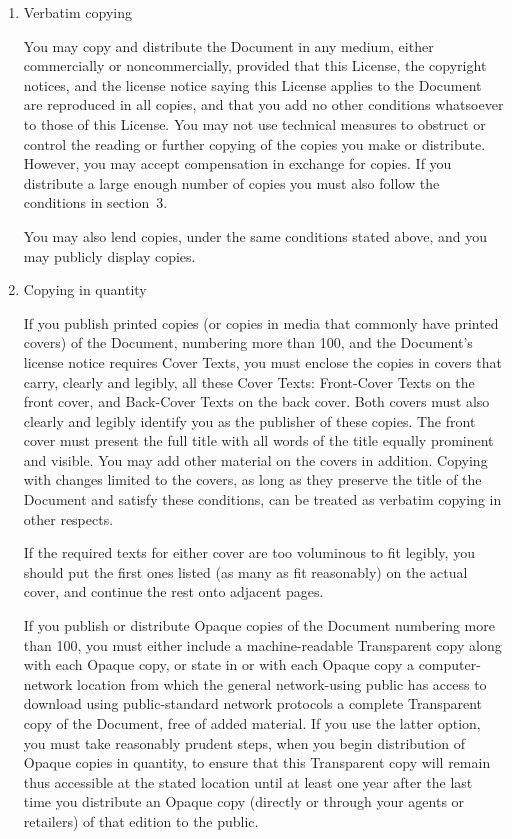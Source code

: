 \begin{enumerate}
The Document may include Warranty Disclaimers next to the notice which
states that this License applies to the Document.  These Warranty
Disclaimers are considered to be included by reference in this
License, but only as regards disclaiming warranties: any other
implication that these Warranty Disclaimers may have is void and has
no effect on the meaning of this License.

\item Verbatim copying

You may copy and distribute the Document in any medium, either
commercially or noncommercially, provided that this License, the
copyright notices, and the license notice saying this License applies
to the Document are reproduced in all copies, and that you add no other
conditions whatsoever to those of this License.  You may not use
technical measures to obstruct or control the reading or further
copying of the copies you make or distribute.  However, you may accept
compensation in exchange for copies.  If you distribute a large enough
number of copies you must also follow the conditions in section~3.

You may also lend copies, under the same conditions stated above, and
you may publicly display copies.

\item Copying in quantity

If you publish printed copies (or copies in media that commonly have
printed covers) of the Document, numbering more than 100, and the
Document's license notice requires Cover Texts, you must enclose the
copies in covers that carry, clearly and legibly, all these Cover
Texts: Front-Cover Texts on the front cover, and Back-Cover Texts on
the back cover.  Both covers must also clearly and legibly identify
you as the publisher of these copies.  The front cover must present
the full title with all words of the title equally prominent and
visible.  You may add other material on the covers in addition.
Copying with changes limited to the covers, as long as they preserve
the title of the Document and satisfy these conditions, can be treated
as verbatim copying in other respects.

If the required texts for either cover are too voluminous to fit
legibly, you should put the first ones listed (as many as fit
reasonably) on the actual cover, and continue the rest onto adjacent
pages.

If you publish or distribute Opaque copies of the Document numbering
more than 100, you must either include a machine-readable Transparent
copy along with each Opaque copy, or state in or with each Opaque copy
a computer-network location from which the general network-using
public has access to download using public-standard network protocols
a complete Transparent copy of the Document, free of added material.
If you use the latter option, you must take reasonably prudent steps,
when you begin distribution of Opaque copies in quantity, to ensure
that this Transparent copy will remain thus accessible at the stated
location until at least one year after the last time you distribute an
Opaque copy (directly or through your agents or retailers) of that
edition to the public.


\end{enumerate}
